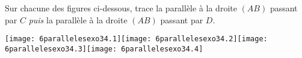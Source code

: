 Sur chacune des figures ci-dessous, trace la parallèle à la
droite $(AB)$ passant par $C$ {\em puis} la parallèle à la
droite $(AB)$ passant par $D$.
\par\texttt{[image: 6parallelesexo34.1]}\hfill\texttt{[image: 6parallelesexo34.2]}\hfill\texttt{[image: 6parallelesexo34.3]}\hfill\texttt{[image: 6parallelesexo34.4]}
